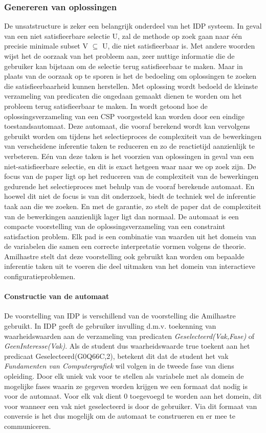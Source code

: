 \subsubsection{Genereren van oplossingen}
De unsatstructure is zeker een belangrijk onderdeel van het IDP systeem. In geval van een niet satisfieerbare selectie U, zal de methode op zoek gaan naar \'{e}\'{e}n precisie minimale subset V $\subseteq$ U, die niet satisfieerbaar is. Met andere woorden wijst het de oorzaak van het probleem aan, zeer nuttige informatie die de gebruiker kan bijstaan om de selectie terug satisfieerbaar te maken. Maar in plaats van de oorzaak op te sporen is het de bedoeling om oplossingen te zoeken die satisfieerbaarheid kunnen herstellen. Met oplossing wordt bedoeld de kleinste verzameling van predicaten die ongedaan gemaakt dienen te worden om het probleem terug satisfieerbaar te maken. In \citep{amilhastre2002consistency} wordt getoond hoe de oplossingsverzameling van een CSP voorgesteld kan worden door een eindige toestandsautomaat. Deze automaat, die vooraf berekend wordt kan vervolgens gebruikt worden om tijdens het selectieproces de complexiteit van de bewerkingen van verscheidene inferentie taken te reduceren en zo de reactietijd aanzienlijk te verbeteren. E\'{e}n van deze taken is het voorzien van oplossingen in geval van een niet-satisfieerbare selectie, en dit is exact hetgeen waar naar we op zoek zijn. De focus van de paper ligt op het reduceren van de complexiteit van de bewerkingen gedurende het selectieproces met behulp van de vooraf berekende automaat. En hoewel dit niet de focus is van dit onderzoek, biedt de techniek wel de inferentie taak aan die we zoeken. En met de garantie, zo stelt de paper dat de complexiteit van de bewerkingen aanzienlijk lager ligt dan normaal. De automaat is een compacte voorstelling van de oplossingsverzameling van een constraint satisfaction problem. Elk pad is een combinatie van waarden uit het domein van de variabelen die samen een correcte interpretatie vormen volgens de theorie. Amilhastre stelt dat deze voorstelling ook gebruikt kan worden om bepaalde inferentie taken uit te voeren die deel uitmaken van het domein van interactieve configuratieproblemen. 

\paragraph{Constructie van de automaat}
De voorstelling van IDP is verschillend van de voorstelling die Amilhastre gebruikt. In IDP geeft de gebruiker invulling d.m.v. toekenning van waarheidswaarden aan de verzameling van predicaten \textit{Geselecteerd(Vak,Fase)} of \textit{GeenInteresse(Vak)}. Als de student dus waarheidswaarde true toekent aan het predicaat Geselecteerd(G0Q66C,2), betekent dit dat de student het vak \textit{Fundamenten van Computergrafiek} wil volgen in de tweede fase van diens opleiding. Door elk uniek vak voor te stellen als variabele met als domein de mogelijke fases waarin ze gegeven worden krijgen we een formaat dat nodig is voor de automaat. Voor elk vak dient 0 toegevoegd te worden aan het domein, dit voor wanneer een vak niet geselecteerd is door de gebruiker. Via dit formaat van conversie is het dus mogelijk om de automaat te construeren en er mee te communiceren.

